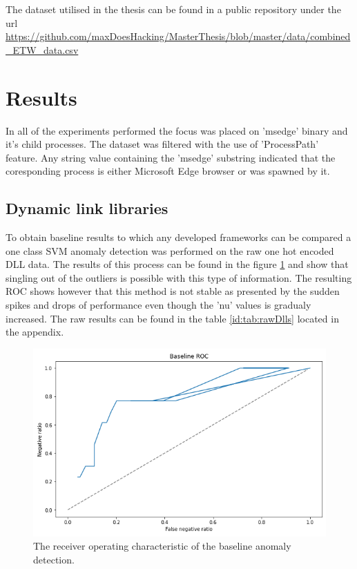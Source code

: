 \documentclass[a4paper,twoside,12pt]{book}
\begin{document}
The dataset utilised in the thesis can be found in a public repository under the url 
\url{https://github.com/maxDoesHacking/MasterThesis/blob/master/data/combined_ETW_data.csv}


\section{Results}

In all of the experiments performed the focus was placed on 'msedge' binary and it's child processes.
The dataset was filtered with the use of 'ProcessPath' feature. Any string value containing the 'msedge'
substring indicated that the coresponding process is either Microsoft Edge browser or was spawned by it. 

\subsection{Dynamic link libraries}
To obtain baseline results to which any developed frameworks can be compared a one class SVM anomaly 
detection was performed on the raw one hot encoded DLL data. The results of this process can be found
in the figure \ref{fig:DLLBaselineROC} and show that singling out of the outliers is possible with this type 
of information. The resulting ROC shows however that this method is not stable as presented by the sudden spikes
and drops of performance even though the 'nu' values is gradualy increased. 
The raw results can be found in the table \ref{id:tab:rawDlls} located in the appendix. 

\begin{figure}
	\centering
	\includegraphics{images/DLLBaselineROCKF}
	\caption{The receiver operating characteristic of the baseline anomaly detection.}
	\label{fig:DLLBaselineROC}
 \end{figure}
	
\end{document}
